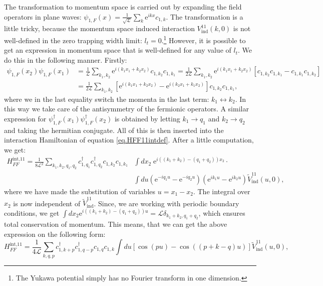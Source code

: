 The transformation to momentum space is carried out by expanding the field operators in plane waves: $\psi_{1,F}(x) = \frac{1}{\sqrt{\mathcal{L}}}\sum_k \text{e}^{ikx} c_{1,k}$. The transformation is a little tricky, because the momentum space induced interaction $V^{11}_{\text{ind}}(k, 0)$ is not well-defined in the zero trapping width limit: $l_t = 0$.\footnote{The Yukawa potential simply has no Fourier transform in one dimension.} However, it is possible to get an expression in momentum space that is well-defined for any value of $l_t$. We do this in the following manner. Firstly:
\begin{align}
\psi_{1,F}(x_2) \psi_{1,F}(x_1) &= \frac{1}{\mathcal{L}}\sum_{k_1,k_2} \text{e}^{i(k_1x_1 + k_2x_2)} c_{1, k_2}c_{1, k_1} = \frac{1}{2\mathcal{L}}\sum_{k_1,k_2} \text{e}^{i(k_1x_1 + k_2x_2)} \left[c_{1, k_2}c_{1, k_1} - c_{1, k_1}c_{1, k_2}\right] \nonumber \\
&= \frac{1}{2\mathcal{L}}\sum_{k_1,k_2} \left[\text{e}^{i(k_1x_1 + k_2x_2)} - \text{e}^{i(k_2x_1 + k_1x_2)}\right]c_{1, k_2}c_{1, k_1}, \nonumber
\end{align}
where we in the last equality switch the momenta in the last term: $k_1 \leftrightarrow k_2$. In this way we take care of the antisymmetry of the fermionic operators. A similar expression for $\psi^\dagger_{1, F}(x_1)\psi^\dagger_{1, F}(x_2)$ is obtained by letting $k_1 \to q_1$ and $k_2 \to q_2$ and taking the hermitian conjugate. All of this is then inserted into the interaction Hamiltonian of equation \eqref{eq.HFF11intdef}. After a little computation, we get:
\begin{align}
H^\text{int,11}_{FF} = \frac{1}{8\mathcal{L}^2} \sum_{k_1,k_2,q_1,q_2} c^\dagger_{1, q_1}c^\dagger_{1, q_2}c_{1, k_2}c_{1, k_1} & \int dx_2 \; \text{e}^{i((k_1 + k_2) -(q_1 + q_2))x_2}\cdot \nonumber \\ 
&\int du\left( \text{e}^{-iq_1u} - \text{e}^{-iq_2u} \right)\left( \text{e}^{ik_1u} - \text{e}^{ik_2u} \right)\tilde{V}^{11}_\text{ind}(u, 0), \nonumber
\end{align}
where we have made the substitution of variables $u = x_1 - x_2$. The integral over $x_2$ is now independent of $\tilde{V}^{11}_{\text{ind}}$. Since, we are working with periodic boundary conditions, we get $\int dx_2 \text{e}^{i((k_1 + k_2) - (q_1 + q_2))u} = \mathcal{L}\delta_{k_1 + k_2, q_1 + q_2}$, which ensures total conservation of momentum. This means, that we can get the above expression on the following form: 
\begin{equation}
H^\text{int,11}_{FF} = \frac{1}{4\mathcal{L}} \sum_{k, q, p} c^\dagger_{1, k + p}c^\dagger_{1, q - p}c_{1, q}c_{1, k} \int du\left[\cos\left(pu\right) - \cos\left(\left( p + k - q \right)u\right)\right]\tilde{V}^{11}_{\text{ind}}(u,0), \nonumber
\end{equation}

